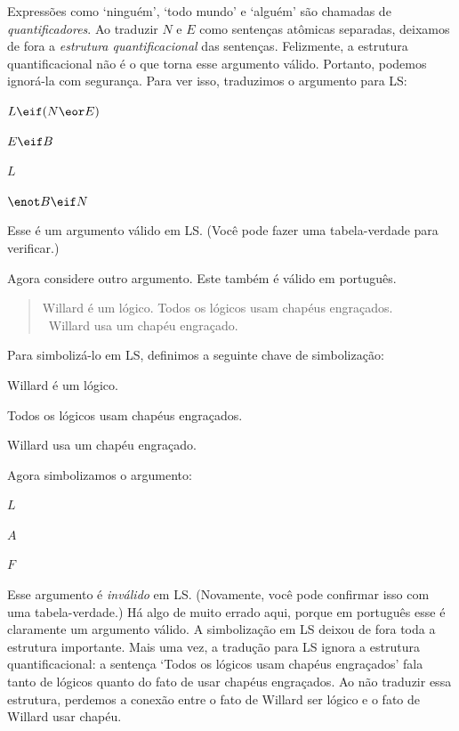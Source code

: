 Expressões como `ninguém', `todo mundo' e `alguém' são chamadas de \emph{quantificadores}. Ao traduzir $N$ e $E$ como sentenças atômicas separadas, deixamos de fora a \emph{estrutura quantificacional} das sentenças. Felizmente, a estrutura quantificacional não é o que torna esse argumento válido. Portanto, podemos ignorá-la com segurança. Para ver isso, traduzimos o argumento para LS:
\begin{earg}
\item[]$L \eif (N \eor E)$
\item[]$E \eif B$
\item[]$L$
\item[\therefore]$\enot B \eif N$
\end{earg}
Esse é um argumento válido em LS. (Você pode fazer uma tabela-verdade para verificar.)

Agora considere outro argumento. Este também é válido em português.

\begin{quote}
\label{willard1}
Willard é um lógico. Todos os lógicos usam chapéus engraçados.\\
\therefore\ Willard usa um chapéu engraçado.
\end{quote}

Para simbolizá-lo em LS, definimos a seguinte chave de simbolização:
\begin{ekey}
\item[L:] Willard é um lógico.
\item[A:] Todos os lógicos usam chapéus engraçados.
\item[F:] Willard usa um chapéu engraçado.
\end{ekey}

Agora simbolizamos o argumento:
\begin{earg}
\item[]$L$
\item[]$A$
\item[\therefore] $F$
\end{earg}

Esse argumento é \emph{inválido} em LS. (Novamente, você pode confirmar isso com uma tabela-verdade.) Há algo de muito errado aqui, porque em português esse é claramente um argumento válido. A simbolização em LS deixou de fora toda a estrutura importante. Mais uma vez, a tradução para LS ignora a estrutura quantificacional: a sentença `Todos os lógicos usam chapéus engraçados' fala tanto de lógicos quanto do fato de usar chapéus engraçados. Ao não traduzir essa estrutura, perdemos a conexão entre o fato de Willard ser lógico e o fato de Willard usar chapéu.

